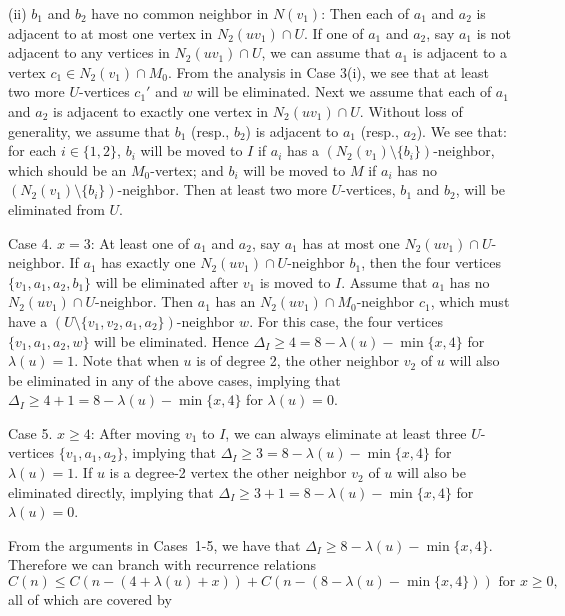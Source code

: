 \documentclass{elsart_TR2}
\begin{document}
(ii) $b_1$ and $b_2$  have no common neighbor in $N(v_1)$:
Then each of $a_1$ and $a_2$ is adjacent to at most one vertex in $N_2(uv_1)\cap U$. If one of $a_1$ and $a_2$, say $a_1$ is not adjacent to any vertices in $N_2(uv_1)\cap U$, we can assume
that $a_1$ is adjacent to a vertex $c_1\in N_2(v_1)\cap M_0$. From the analysis in Case 3(i), we  see that at least two more $U$-vertices $c_1'$ and $w$ will be eliminated. Next we assume
that each of $a_1$ and $a_2$ is adjacent to exactly one vertex in $N_2(uv_1)\cap U$. Without loss of generality, we assume that $b_1$ (resp., $b_2$) is adjacent to $a_1$  (resp.,  $a_2$).
We   see that: for each $i\in\{1,2\}$, $b_i$ will be moved to $I$ if $a_i$ has a  $(N_2(v_1)\setminus\{b_i\})$-neighbor,
which should be an $M_0$-vertex; and $b_i$ will be moved to $M$ if $a_i$ has no $(N_2(v_1)\setminus\{b_i\})$-neighbor.
Then at least two more $U$-vertices, $b_1$ and $b_2$, will be eliminated from $U$.

Case 4.  $x=3$: At least one of $a_1$ and $a_2$, say $a_1$ has at most  one $N_2(uv_1)\cap U$-neighbor.
If $a_1$ has exactly one $N_2(uv_1)\cap U$-neighbor $b_1$,
then  the four vertices $\{v_1, a_1, a_2,b_1\}$ will be eliminated after $v_1$ is moved to $I$.
Assume that $a_1$ has no $N_2(uv_1)\cap U$-neighbor.
Then  $a_1$ has an $N_2(uv_1)\cap M_0$-neighbor $c_1$, which  must have
 a $(U\setminus\{v_1,v_2, a_1, a_2\})$-neighbor $w$.
For this case, the four vertices $\{v_1, a_1, a_2,w\}$ will be eliminated.
Hence
$\Delta_I\geq 4=8-\lambda(u)-\min\{x,4\}$ for $\lambda(u)=1$.
Note that when $u$ is of degree 2,
the other neighbor $v_2$ of $u$ will also be eliminated in any of the above cases,
 implying that $\Delta_I\geq 4+1=8-\lambda(u)-\min\{x,4\}$ for $\lambda(u)=0$.

Case 5. $x\geq 4$: After moving $v_1$ to $I$, we can always eliminate at least three $U$-vertices $\{v_1, a_1, a_2\}$,
 implying that $\Delta_I\geq 3=8-\lambda(u)-\min\{x,4\}$ for $\lambda(u)=1$.
If $u$ is a degree-2 vertex the other neighbor $v_2$ of $u$ will also be eliminated directly,
 implying that $\Delta_I\geq 3+1=8-\lambda(u)-\min\{x,4\}$ for $\lambda(u)=0$.

\medskip
From the arguments in Cases~1-5, we have that $\Delta_I\geq 8-\lambda(u)-\min\{x,4\}$.
Therefore we can branch with recurrence relations
$$C(n)\leq C(n\!-\!(4+\lambda(u)+x)) \!+\!C(n\!-\!  (8\!-\!\lambda(u)\!-\! \min\{x,4\}) )  \mbox{ for $x\geq 0$}, $$
all of which are covered by
\medskip
\end{document}
